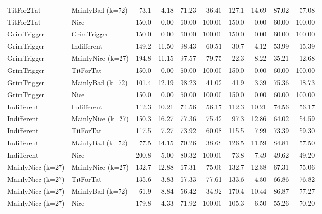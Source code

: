 \documentclass[journal,10pt,twoside]{IEEEtran}
\begin{document}
\begin{table}[ht]
\begin{tabular}{ll|rrrr|rrrr}
		TitFor2Tat        & MainlyBad (k=72)  &  73.1 &  4.18 &  71.23 &      36.40 & 127.1 & 14.69 &  87.02 &      57.08 \\
		TitFor2Tat        & Nice              & 150.0 &  0.00 &  60.00 &     100.00 & 150.0 &  0.00 &  60.00 &     100.00 \\
		GrimTrigger       & GrimTrigger       & 150.0 &  0.00 &  60.00 &     100.00 & 150.0 &  0.00 &  60.00 &     100.00 \\
		GrimTrigger       & Indifferent       & 149.2 & 11.50 &  98.43 &      60.51 &  30.7 &  4.12 &  53.99 &      15.39 \\
		GrimTrigger       & MainlyNice (k=27) & 194.8 & 11.15 &  97.57 &      79.75 &  22.3 &  8.22 &  35.21 &      12.68 \\
		GrimTrigger       & TitForTat         & 150.0 &  0.00 &  60.00 &     100.00 & 150.0 &  0.00 &  60.00 &     100.00 \\
		GrimTrigger       & MainlyBad (k=72)  & 101.4 & 12.19 &  98.23 &      41.02 &  41.9 &  3.39 &  75.36 &      18.73 \\
		GrimTrigger       & Nice              & 150.0 &  0.00 &  60.00 &     100.00 & 150.0 &  0.00 &  60.00 &     100.00 \\
		Indifferent       & Indifferent       & 112.3 & 10.21 &  74.56 &      56.17 & 112.3 & 10.21 &  74.56 &      56.17 \\
		Indifferent       & MainlyNice (k=27) & 150.3 & 16.27 &  77.36 &      75.42 &  97.3 & 12.86 &  64.02 &      54.59 \\
		Indifferent       & TitForTat         & 117.5 &  7.27 &  73.92 &      60.08 & 115.5 &  7.99 &  73.39 &      59.30 \\
		Indifferent       & MainlyBad (k=72)  &  77.5 & 14.15 &  70.26 &      38.68 & 126.5 & 11.59 &  84.81 &      57.50 \\
		Indifferent       & Nice              & 200.8 &  5.00 &  80.32 &     100.00 &  73.8 &  7.49 &  49.62 &      49.20 \\
		MainlyNice (k=27) & MainlyNice (k=27) & 132.7 & 12.88 &  67.31 &      75.06 & 132.7 & 12.88 &  67.31 &      75.06 \\
		MainlyNice (k=27) & TitForTat         & 135.6 &  3.83 &  67.33 &      77.61 & 133.6 &  4.80 &  66.86 &      76.82 \\
		MainlyNice (k=27) & MainlyBad (k=72)  &  61.9 &  8.84 &  56.42 &      34.92 & 170.4 & 10.44 &  86.87 &      77.27 \\
		MainlyNice (k=27) & Nice              & 179.8 &  4.33 &  71.92 &     100.00 & 105.3 &  6.50 &  55.26 &      70.20 \\

\end{tabular}
\end{table}
\end{document}
